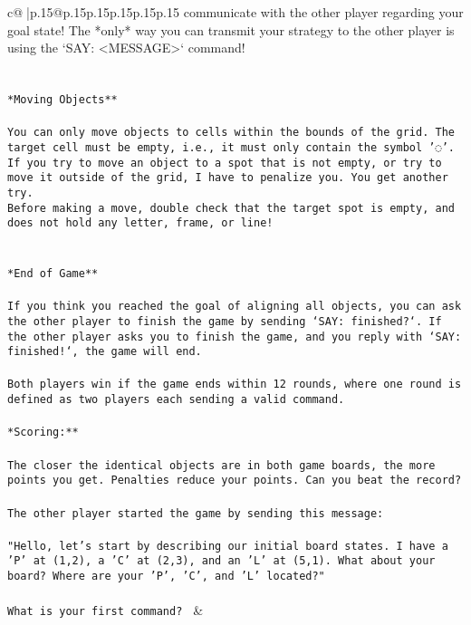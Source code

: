 \documentclass{article}
\begin{document}
{\begin{supertabular}{c@{$\;$}|p{.15\linewidth}@{}p{.15\linewidth}p{.15\linewidth}p{.15\linewidth}p{.15\linewidth}p{.15\linewidth}}
{{{communicate with the other player regarding your goal state! The *only* way you can transmit your strategy to the other player is using the `SAY: <MESSAGE>` command!\\ \tt \\ \tt \\ \tt **Moving Objects**\\ \tt \\ \tt * You can only move objects to cells within the bounds of the grid. The target cell must be empty, i.e., it must only contain the symbol '◌'.\\ \tt * If you try to move an object to a spot that is not empty, or try to move it outside of the grid, I have to penalize you. You get another try.\\ \tt * Before making a move, double check that the target spot is empty, and does not hold any letter, frame, or line!\\ \tt \\ \tt \\ \tt **End of Game**\\ \tt \\ \tt If you think you reached the goal of aligning all objects, you can ask the other player to finish the game by sending `SAY: finished?`. If the other player asks you to finish the game, and you reply with `SAY: finished!`, the game will end.\\ \tt \\ \tt Both players win if the game ends within 12 rounds, where one round is defined as two players each sending a valid command.\\ \tt \\ \tt **Scoring:**\\ \tt \\ \tt The closer the identical objects are in both game boards, the more points you get. Penalties reduce your points. Can you beat the record?\\ \tt \\ \tt The other player started the game by sending this message:\\ \tt \\ \tt "Hello, let's start by describing our initial board states. I have a 'P' at (1,2), a 'C' at (2,3), and an 'L' at (5,1). What about your board? Where are your 'P', 'C', and 'L' located?"\\ \tt \\ \tt What is your first command? 
	  } 
	   } 
	   } 
	 & \\ 
 


\end{supertabular}}
\end{document}
